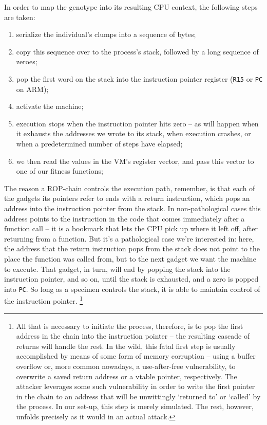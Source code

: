 In order to map the genotype
into its resulting CPU context, the following steps are taken:
{\small
\begin{enumerate} 
  \item serialize the individual's clumps into a sequence of bytes;
  \item copy this sequence over to the process's stack, followed by a long sequence of zeroes;
  \item pop the first word on the stack into the instruction pointer register (\texttt{R15} or \texttt{PC} on ARM);
  \item activate the machine;
  \item execution stops when the instruction pointer hits zero -- as will happen when it exhausts the addresses we wrote to its stack, when execution crashes, or when a predetermined number of steps have elapsed;
  \item we then read the values in the VM's register vector, and pass this vector to one of our fitness functions;
\end{enumerate}
}
The reason a ROP-chain controls the execution path,
remember, is that each of the gadgets 
its pointers refer to ends with a return instruction, which pops
an address into the instruction pointer from the stack. In 
non-pathological cases this address points to the instruction in
the code that comes immediately after a function call -- it is a
bookmark that lets the CPU pick up where it left off,
after returning from a function. But it's a pathological case
we're interested in: 
here, the
address that the return instruction pops from the stack does not
point to the place the function was called from, but to the next
gadget we want the machine to execute. That gadget, in turn,
will end by popping the stack into the instruction pointer, and so
on, until the stack is exhausted, and a zero is popped into
\texttt{PC}. So long as a specimen controls the stack, it is able
to maintain control of the instruction pointer.%
\footnote{All that is necessary to initiate the process, therefore, is to
pop the first address in the chain into the instruction pointer --
the resulting cascade of returns will handle the rest. In the
wild, this fatal first step is usually accomplished by means of
some form of memory corruption -- using a buffer overflow or,
more common nowadays, a use-after-free vulnerability, to
overwrite a saved return address or a vtable pointer,
respectively.  The attacker leverages some such
vulnerability in order to write the first pointer in the chain
to an address that will be unwittingly `returned to' or `called'
by the process. In our set-up, this step is merely simulated. The
rest, however, unfolds precisely as it would in an actual
attack.}

